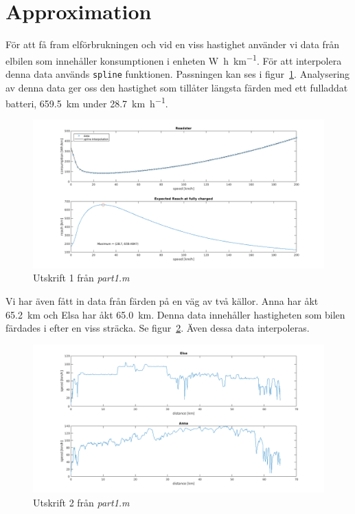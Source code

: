 \documentclass[]{scrreprt}
\begin{document}
\section{Approximation}
För att få fram elförbrukningen och vid en viss hastighet använder vi data från elbilen som innehåller konsumptionen i enheten \si{\watt\hour\per\kilo\meter}.
För att interpolera denna data används \texttt{spline} funktionen. Passningen kan ses i figur~\ref{fig:rgraph}.
Analysering av denna data ger oss den hastighet som tillåter längsta färden med ett fulladdat batteri, \SI{659.5}{\kilo\meter} under \SI{28.7}{\kilo\meter\per\hour}.
\begin{figure}[H]
	\caption{Utskrift 1 från \textit{part1.m}}
	\label{fig:rgraph}
	\includegraphics[width=1.2\textwidth]{roadster/part1.png}
\end{figure}
Vi har även fått in data från färden på en väg av två källor. Anna har åkt \SI{65.2}{\kilo\meter} och Elsa har åkt \SI{65.0}{\kilo\meter}. Denna data innehåller hastigheten som bilen färdades i efter en viss sträcka. Se figur~\ref{fig:ea_graph}. Även dessa data interpoleras.
\begin{figure}[H]
	\caption{Utskrift 2 från \textit{part1.m}}
	\label{fig:ea_graph}
	\includegraphics[width=1.2\textwidth]{roadster/elsa_anna.png}
\end{figure}
\end{document}
